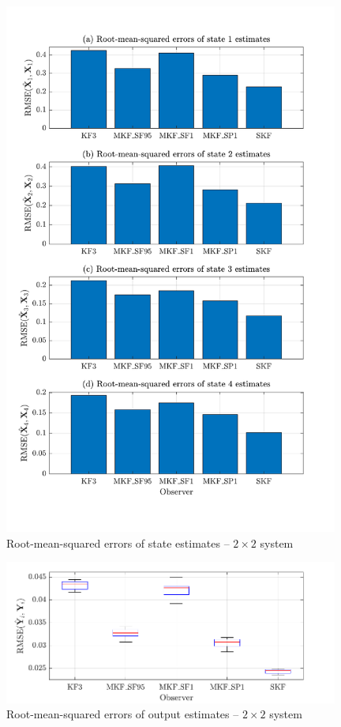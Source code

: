 
\begin{figure}[htp]
	\centering
	\includegraphics[width=11cm]{images/rod_obs_sim2_all_seed_x_err_bar.pdf}
	\caption{Root-mean-squared errors of state estimates – $2\times2$ system}
	\label{fig:rod-obs-sim2-xest-RMSE-bar}
\end{figure}

\begin{figure}[htp]
	\centering
	\includegraphics[width=11cm]{images/rod_obs_sim2_all_seed_y_err_box.pdf}
	\caption{Root-mean-squared errors of output estimates – $2\times2$ system}
	\label{fig:rod-obs-sim2-yest-all-seed-RMSE-box}
\end{figure}

